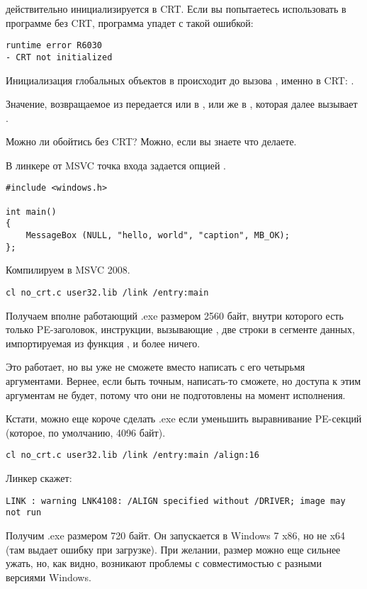  действительно инициализируется в \ac{CRT}.
Если вы попытаетесь использовать  в программе без CRT, программа упадет с такой ошибкой:

\begin{lstlisting}
runtime error R6030
- CRT not initialized
\end{lstlisting}

Инициализация глобальных объектов в \Cpp происходит до вызова \main{}, именно в \ac{CRT}: 
.

Значение, возвращаемое из \main{} передается или в , 
или же в , которая далее вызывает .

Можно ли обойтись без \ac{CRT}? Можно, если вы знаете что делаете.

В линкере от \ac{MSVC} точка входа задается опцией .

\begin{lstlisting}
#include <windows.h>

int main()
{
	MessageBox (NULL, "hello, world", "caption", MB_OK);
};
\end{lstlisting}

Компилируем в MSVC 2008.

\begin{lstlisting}
cl no_crt.c user32.lib /link /entry:main
\end{lstlisting}

Получаем вполне работающий .exe размером 2560 байт, внутри которого есть только PE-заголовок, инструкции, 
вызывающие ,
две строки в сегменте данных, импортируемая из  функция , и более ничего.

Это работает, но вы уже не сможете вместо \main{} написать  с его четырьмя аргументами.
Вернее, если быть точным, написать-то сможете, но доступа к этим аргументам не будет, 
потому что они не подготовлены на момент исполнения.

Кстати, можно еще короче сделать .exe если уменьшить 
выравнивание \ac{PE}-секций (которое, по умолчанию, 4096 байт).

\begin{lstlisting}
cl no_crt.c user32.lib /link /entry:main /align:16
\end{lstlisting}

Линкер скажет:

\begin{lstlisting}
LINK : warning LNK4108: /ALIGN specified without /DRIVER; image may not run
\end{lstlisting}

Получим .exe размером 720 байт.
Он запускается в Windows 7 x86, но не x64 
(там выдает ошибку при загрузке).
При желании, размер можно еще сильнее ужать, но, как видно, 
возникают проблемы с совместимостью с разными версиями Windows.

